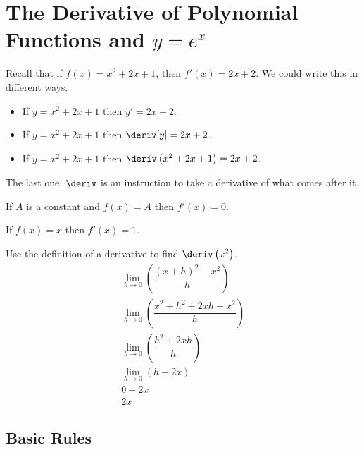 
\section{The Derivative of Polynomial Functions and \texorpdfstring{$y = e^x$}{y = e\textasciicircum x}}
Recall that if $f(x) = x^2 + 2x + 1$, then $f'(x) = 2x + 2$. We could write this in different ways.
\begin{itemize}
    \item If $y = x^2 + 2x + 1$ then $y' = 2x + 2$.
    \item If $y = x^2 + 2x + 1$ then $\deriv[y] = 2x + 2$.
    \item If $y = x^2 + 2x + 1$ then $\deriv \left(x^2 + 2x + 1\right) = 2x + 2$.
\end{itemize}
\begin{remark}
    The last one, $\deriv$ is an instruction to take a derivative of what comes after it.
\end{remark}
\begin{theorem}
    If $A$ is a constant and $f(x) = A$ then $f'(x) = 0$.
\end{theorem}
\begin{theorem}
    If $f(x) = x$ then $f'(x) = 1$.
\end{theorem}
\begin{review}
    Use the definition of a derivative to find $\deriv \left(x^2\right)$.
    \begin{gather*}
        \lim_{h \to 0}\left(\dfrac{\left(x + h\right)^2 - x^2}{h}\right) \\
        \lim_{h \to 0}\left(\dfrac{x^2 + h^2 + 2xh - x^2}{h}\right) \\
        \lim_{h \to 0}\left(\dfrac{h^2 + 2xh}{h}\right) \\
        \lim_{h \to 0}\left(h + 2x\right) \\
        0 + 2x \\
        2x
    \end{gather*}
\end{review}
\subsection{Basic Rules}
